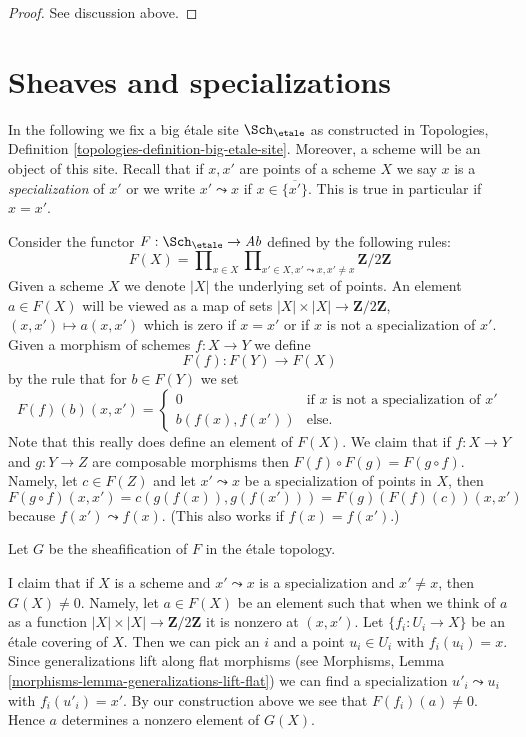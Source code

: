 \begin{proof}
See discussion above.
\end{proof}








\section{Sheaves and specializations}
\label{section-sheaves}

\noindent
In the following we fix a big \'etale site $\Sch_\etale$
as constructed in
Topologies, Definition \ref{topologies-definition-big-etale-site}.
Moreover, a scheme will be an object of this site.
Recall that if $x, x'$ are points of a scheme $X$ we say $x$ is a
{\it specialization} of $x'$ or we write $x' \leadsto x$ if
$x \in \overline{\{x'\}}$. This is true in particular if $x = x'$.

\medskip\noindent
Consider the functor $F : \Sch_\etale \to \textit{Ab}$
defined by the following rules:
$$
F(X) = \prod\nolimits_{x \in X}
\prod\nolimits_{x' \in X, x' \leadsto x, x' \not = x}
\mathbf{Z}/2\mathbf{Z}
$$
Given a scheme $X$ we denote $|X|$ the underlying set of points.
An element $a \in F(X)$ will be viewed as a map of sets
$|X| \times |X| \to \mathbf{Z}/2\mathbf{Z}$, $(x, x') \mapsto a(x, x')$
which is zero if $x = x'$ or if $x$ is not a specialization of $x'$.
Given a morphism of schemes $f : X \to Y$ we define
$$
F(f) : F(Y) \longrightarrow F(X)
$$
by the rule that for $b \in F(Y)$ we set
$$
F(f)(b)(x, x') =
\left\{
\begin{matrix}
0 & \text{if }x\text{ is not a specialization of }x' \\
b(f(x), f(x')) & \text{else.}
\end{matrix}
\right.
$$
Note that this really does define an element of $F(X)$. We claim that if
$f : X \to Y$ and $g : Y \to Z$ are composable morphisms then
$F(f) \circ F(g) = F(g \circ f)$. Namely, let $c \in F(Z)$ and let
$x' \leadsto x$ be a specialization of points in $X$, then
$$
F(g \circ f)(x, x') = c(g(f(x)), g(f(x'))) = F(g)(F(f)(c))(x, x')
$$
because $f(x') \leadsto f(x)$. (This also works if $f(x) = f(x')$.)

\medskip\noindent
Let $G$ be the sheafification of $F$ in the \'etale topology.

\medskip\noindent
I claim that if $X$ is a scheme and $x' \leadsto x$ is a specialization
and $x' \not = x$, then $G(X) \not = 0$. Namely, let $a \in F(X)$ be
an element such that when we think of $a$ as a function
$|X| \times |X| \to \mathbf{Z}/2\mathbf{Z}$ it is nonzero at $(x, x')$.
Let $\{f_i : U_i \to X\}$ be an \'etale covering of $X$. Then we can pick an
$i$ and a point $u_i \in U_i$ with $f_i(u_i) = x$. Since generalizations
lift along flat morphisms (see
Morphisms, Lemma \ref{morphisms-lemma-generalizations-lift-flat})
we can find a specialization $u'_i \leadsto u_i$
with $f_i(u'_i) = x'$. By our construction above we see that
$F(f_i)(a) \not = 0$. Hence $a$ determines a nonzero element of $G(X)$.


